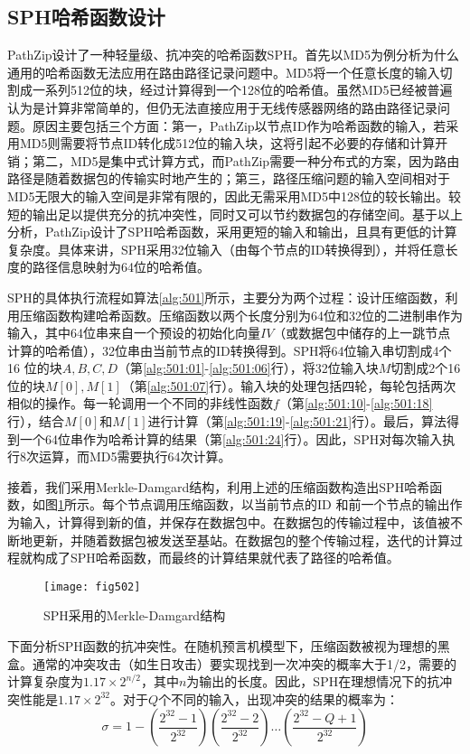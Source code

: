 \subsection{SPH哈希函数设计}
PathZip设计了一种轻量级、抗冲突的哈希函数SPH。首先以MD5为例分析为什么通用的哈希函数无法应用在路由路径记录问题中。MD5将一个任意长度的输入切割成一系列512位的块，经过计算得到一个128位的哈希值。虽然MD5已经被普遍认为是计算非常简单的，但仍无法直接应用于无线传感器网络的路由路径记录问题。原因主要包括三个方面：第一，PathZip以节点ID作为哈希函数的输入，若采用MD5则需要将节点ID转化成512位的输入块，这将引起不必要的存储和计算开销；第二，MD5是集中式计算方式，而PathZip需要一种分布式的方案，因为路由路径是随着数据包的传输实时地产生的；第三，路径压缩问题的输入空间相对于MD5无限大的输入空间是非常有限的，因此无需采用MD5中128位的较长输出。较短的输出足以提供充分的抗冲突性，同时又可以节约数据包的存储空间。基于以上分析，PathZip设计了SPH哈希函数，采用更短的输入和输出，且具有更低的计算复杂度。具体来讲，SPH采用32位输入（由每个节点的ID转换得到），并将任意长度的路径信息映射为64位的哈希值。

SPH的具体执行流程如算法\ref{alg:501}所示，主要分为两个过程：设计压缩函数，利用压缩函数构建哈希函数。压缩函数以两个长度分别为64位和32位的二进制串作为输入，其中64位串来自一个预设的初始化向量$IV$（或数据包中储存的上一跳节点计算的哈希值），32位串由当前节点的ID转换得到。SPH将64位输入串切割成4个16 位的块$A,B,C,D$（第\ref{alg:501:01}-\ref{alg:501:06}行），将32位输入块$M$切割成2个16位的块$M[0],M[1]$（第\ref{alg:501:07}行）。输入块的处理包括四轮，每轮包括两次相似的操作。每一轮调用一个不同的非线性函数$f$（第\ref{alg:501:10}-\ref{alg:501:18} 行），结合$M[0]$和$M[1]$进行计算（第\ref{alg:501:19}-\ref{alg:501:21}行）。最后，算法得到一个64位串作为哈希计算的结果（第\ref{alg:501:24}行）。因此，SPH对每次输入执行8次运算，而MD5需要执行64次计算。

接着，我们采用Merkle-Damgard结构，利用上述的压缩函数构造出SPH哈希函数，如图\ref{fig:502}所示。每个节点调用压缩函数，以当前节点的ID 和前一个节点的输出作为输入，计算得到新的值，并保存在数据包中。在数据包的传输过程中，该值被不断地更新，并随着数据包被发送至基站。在数据包的整个传输过程，迭代的计算过程就构成了SPH哈希函数，而最终的计算结果就代表了路径的哈希值。
\begin{figure}[h]
\centering
\texttt{[image: fig502]}
\caption{SPH采用的Merkle-Damgard结构}
\label{fig:502}
\end{figure}

下面分析SPH函数的抗冲突性。在随机预言机模型下，压缩函数被视为理想的黑盒。通常的冲突攻击（如生日攻击）要实现找到一次冲突的概率大于1/2，需要的计算复杂度为$1.17\times2^{n/2}$，其中$n$为输出的长度。因此，SPH在理想情况下的抗冲突性能是$1.17\times2^{32}$。对于$Q$个不同的输入，出现冲突的结果的概率为：
\begin{equation}\label{equ:601}
\sigma=1-\left(\frac{2^{32}-1}{2^{32}}\right)\left(\frac{2^{32}-2}{2^{32}}\right)\ldots\left(\frac{2^{32}-Q+1}{2^{32}}\right)
\end{equation}

